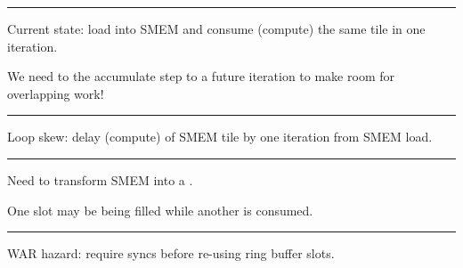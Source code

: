 \hrule

{\LARGE
Current state: load into SMEM and consume (compute) the same tile in one  iteration.

We need to  the accumulate step to a future  iteration to make room for overlapping work!

}

\newpage
{}

{
\Large
\begin{tikzpicture}[node distance=0mm]



\end{tikzpicture}
}

\hrule

{\LARGE
Loop skew: delay  (compute) of SMEM tile by one  iteration from SMEM load.

}

\newpage
{}

{
\Large
\begin{tikzpicture}[node distance=0mm]




\end{tikzpicture}
}

\hrule

{\LARGE
Need to transform SMEM into a .

One slot may be being filled while another is consumed.

}

\newpage
{}

{
\Large
\begin{tikzpicture}[node distance=0mm]





\end{tikzpicture}
}

\hrule

{\LARGE
WAR hazard: require syncs before re-using ring buffer slots.

}


\newpage
{}

{
\Large
\begin{tikzpicture}[node distance=0mm]





\end{tikzpicture}
}

